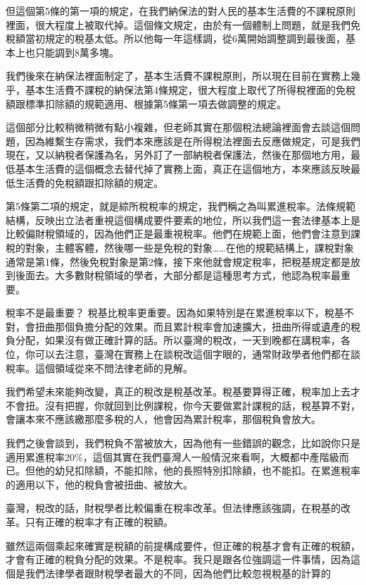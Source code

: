 \documentclass[]{ctexbook}
\begin{document}
但這個第5條的第一項的規定，在我們納保法的對人民的基本生活費的不課稅原則裡面，很大程度上被取代掉。這個條文規定，由於有一個體制上問題，就是我們免稅額當初規定的稅基太低。所以他每一年這樣調，從6萬開始調整調到最後面，基本上也只能調到8萬多塊。

我們後來在納保法裡面制定了，基本生活費不課稅原則，所以現在目前在實務上幾乎，基本生活費不課稅的納保法第4條規定，很大程度上取代了所得稅裡面的免稅額跟標準扣除額的規範適用、根據第5條第一項去做調整的規定。

這個部分比較稍微稍微有點小複雜，但老師其實在那個稅法總論裡面會去談這個問題，因為維繫生存需求，我們本來應該是在所得稅法裡面去反應做規定，可是我們現在，又以納稅者保護為名，另外訂了一部納稅者保護法，然後在那個地方用，最低基本生活費的這個概念去替代掉了實務上面，真正在這個地方，本來應該反映最低生活費的免稅額跟扣除額的規定。

第5條第二項的規定，就是綜所稅稅率的規定，我們稱之為叫累進稅率。法條規範結構，反映出立法者重視這個構成要件要素的地位，所以我們這一套法律基本上是比較偏財稅領域的，因為他們正是最重視稅率。他們在規範上面，他們會注意到課稅的對象，主體客體，然後哪一些是免稅的對象\ldots\ldots 在他的規範結構上，課稅對象通常是第1條，然後免稅對象是第2條，接下來他就會規定稅率，把稅基規定都是放到後面去。大多數財稅領域的學者，大部分都是這種思考方式，他認為稅率最重要。

稅率不是最重要？ 稅基比稅率更重要。因為如果特別是在累進稅率以下，稅基不對，會扭曲那個負擔分配的效果。而且累計稅率會加速擴大，扭曲所得或遺產的稅負分配，如果沒有做正確計算的話。所以臺灣的稅改，一天到晚都在講稅率，各位，你可以去注意，臺灣在實務上在談稅改這個字眼的，通常財政學者他們都在談稅率。這個領域從來不問法律老師的見解。

我們希望未來能夠改變，真正的稅改是稅基改革。稅基要算得正確，稅率加上去才不會扭。沒有把握，你就回到比例課稅，你今天要做累計課稅的話，稅基算不對，會讓本來不應該繳那麼多稅的人，他會因為累計稅率，那個稅負會放大。

我們之後會談到，我們稅負不當被放大，因為他有一些錯誤的觀念，比如說你只是適用累進稅率20\%，這個其實在我們臺灣人一般情況來看啊，大概都中產階級而已。但他的幼兒扣除額，不能扣除，他的長照特別扣除額，也不能扣。在累進稅率的適用以下，他的稅負會被扭曲、被放大。

臺灣，稅改的話，財稅學者比較偏重在稅率改革。但法律應該強調，在稅基的改革。只有正確的稅率才有正確的稅額。

雖然這兩個乘起來確實是稅額的前提構成要件，但正確的稅基才會有正確的稅額，才會有正確的稅負分配的效果。不是稅率。我只是跟各位強調這一件事情，因為這個是我們法律學者跟財稅學者最大的不同，因為他們比較忽視稅基的計算的
\end{document}
